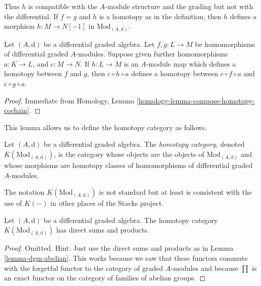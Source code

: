 \noindent
Thus $h$ is compatible with the $A$-module structure and the grading
but not with the differential. If $f = g$ and $h$ is a homotopy
as in the definition, then $h$ defines a morphism $h : M \to N[-1]$
in $\text{Mod}_{(A, \text{d})}$.

\begin{lemma}
\label{lemma-compose-homotopy}
Let $(A, \text{d})$ be a differential graded algebra.
Let $f, g : L \to M$ be homomorphisms of differential graded $A$-modules.
Suppose given further homomorphisms $a : K \to L$, and $c : M \to N$.
If $h : L \to M$ is an $A$-module map which defines a homotopy between
$f$ and $g$, then $c \circ h \circ a$ defines a homotopy between
$c \circ f \circ a$ and $c \circ g \circ a$.
\end{lemma}

\begin{proof}
Immediate from Homology, Lemma \ref{homology-lemma-compose-homotopy-cochain}.
\end{proof}

\noindent
This lemma allows us to define the homotopy category as follows.

\begin{definition}
\label{definition-complexes-notation}
Let $(A, \text{d})$ be a differential graded algebra.
The {\it homotopy category}, denoted $K(\text{Mod}_{(A, \text{d})})$, is
the category whose objects are the objects of
$\text{Mod}_{(A, \text{d})}$ and whose morphisms are homotopy classes
of homomorphisms of differential graded $A$-modules.
\end{definition}

\noindent
The notation $K(\text{Mod}_{(A, \text{d})})$ is not standard but at least is
consistent with the use of $K(-)$ in other places of the Stacks project.

\begin{lemma}
\label{lemma-homotopy-direct-sums}
Let $(A, \text{d})$ be a differential graded algebra.
The homotopy category $K(\text{Mod}_{(A, \text{d})})$
has direct sums and products.
\end{lemma}

\begin{proof}
Omitted. Hint: Just use the direct sums and products as in
Lemma \ref{lemma-dgm-abelian}. This works because we saw that
these functors commute with the forgetful functor to the category
of graded $A$-modules and because $\prod$ is an exact functor
on the category of families of abelian groups.
\end{proof}







